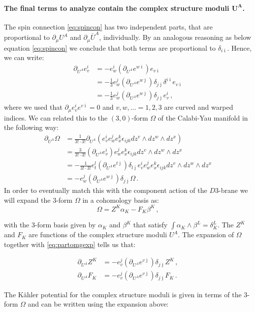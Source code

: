 \documentclass[a4paper,12pt,twoside,openright]{report}
\newcommand{\be}{\begin{equation}}
\newcommand{\ee}{\end{equation}}
\newcommand{\bea}{\begin{equation}\begin{aligned}}
\newcommand{\eea}{\end{aligned}\end{equation}}
\def\ib{{\bar \imath}}
\def\jb{{\bar \jmath}}
\begin{document}
\paragraph{The final terms to analyze contain the complex structure moduli $\mathbf{U^A}$.} The spin connection \eqref{eq:spincon} has two independent parts, that are proportional to $\partial_\mu U^A$ and $\partial_\mu \bar{U}^A$, individually. By an analogous reasoning as below equation \eqref{eq:spincon} we conclude that both terms are proportional to $\delta_{i\ib}$. Hence,  we can write:
\bea
\partial_{U^A} e^i_v 
&= - e^i_{w} (\partial_{U^A} e^{w\ib} ) e_{v\ib}\\
&= -\frac{1}{3} e^j_w (\partial_{U^A} e^{w\jb} ) \delta_{j\jb} \delta^{i\ib} e_{v\ib}\\
&= -\frac{1}{3} e^j_w (\partial_{U^A} e^{w\jb} ) \delta_{j\jb}  e^i_{v}\,,
\eea
where we used that $\partial_\mu e^i_v e^{v\ib} = 0$ and $v,w,\ldots = 1,2,3$ are curved and warped indices. We can related this to the $(3,0)$-form $\Omega$ of the Calabi-Yau manifold in the following way:
\bea
\partial_{U^A} \Omega &= \frac{1}{3! \cdot 3!} \partial_{U^A} \left( e^i_v e^j_w e^k_x \epsilon_{ijk} dz^v \wedge dz^w \wedge dz^x\right)\\
&= \frac{3}{3! \cdot 3!} \left(\partial_{U^A}  e^i_v\right) e^j_w e^k_x \epsilon_{ijk} dz^v \wedge dz^w \wedge dz^x\\
&= - \frac{1}{3! \cdot 3!} e^l_t \left(\partial_{U^A} e^{t\jb}\right) \delta_{l\jb} e^i_v e^j_w e^k_x \epsilon_{ijk} dz^v \wedge dz^w \wedge dz^x\\
&= -e^j_w \left(\partial_{U^A} e^{w\jb} \right) \delta_{j\jb} \Omega\,.
\label{eq:partomgexp}
\eea
In order to eventually match this with the component action of the $D3$-brane we will expand the 3-form $\Omega$ in a cohomology basis as:
\be 
\Omega = Z^K \alpha_K - F_K \beta^K\,,
\ee

with the 3-form basis given by $\alpha_K$ and $\beta^K$ that satisfy $\int \alpha_K \wedge \beta^L = \delta^L_K$. The $Z^K$ and $F_K$ are functions of the complex structure moduli $U^A$. The expansion of $\Omega$ together with \eqref{eq:partomgexp} tells us that:

\bea 
\partial_{U^A} Z^K &= - e^j_v \left(\partial_{U^A} e^{v\jb} \right) \delta_{j\jb} Z^K\,,\\
\partial_{U^A} F_K &= -e^j_v \left(\partial_{U^A} e^{v\jb}\right) \delta_{j\jb} F_K\,.
\eea

The Kähler potential for the complex structure moduli is given in terms of the 3-form $\Omega$ and can be written using the expansion above:
\end{document}
